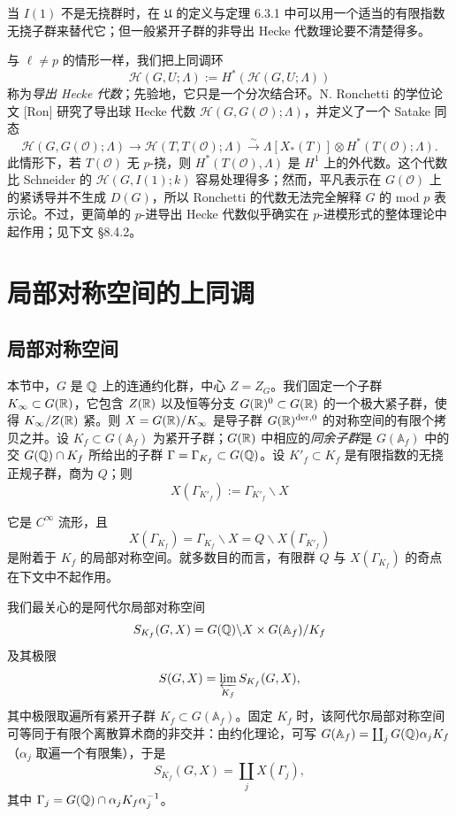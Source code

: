 当 $I(1)$ 不是无挠群时，在 $\mathfrak U$ 的定义与定理 6.3.1 中可以用一个适当的有限指数无挠子群来替代它；但一般紧开子群的非导出 Hecke 代数理论要不清楚得多。

与 $\ell\ne p$ 的情形一样，我们把上同调环
\[
\mathcal H(G,U;\Lambda):=H^*(\mathscr H(G,U;\Lambda))
\]
称为\emph{导出 Hecke 代数}；先验地，它只是一个分次结合环。N. Ronchetti 的学位论文 [Ron] 研究了导出球 Hecke 代数 $\mathcal H(G,G(\mathcal O);\Lambda)$，并定义了一个 Satake 同态
\[
\mathcal H(G,G(\mathcal O);\Lambda)\to\mathcal H(T,T(\mathcal O);\Lambda)
\xrightarrow{\sim}\Lambda[X_*(T)]\otimes H^*(T(\mathcal O);\Lambda).
\]
此情形下，若 $T(\mathcal O)$ 无 $p$-挠，则 $H^*(T(\mathcal O),\Lambda)$ 是 $H^1$ 上的外代数。这个代数比 Schneider 的 $\mathscr H(G,I(1);k)$ 容易处理得多；然而，平凡表示在 $G(\mathcal O)$ 上的紧诱导并不生成 $D(G)$，所以 Ronchetti 的代数无法完全解释 $G$ 的 mod $p$ 表示论。不过，更简单的 $p$-进导出 Hecke 代数似乎确实在 $p$-进模形式的整体理论中起作用；见下文 §8.4.2。

\section{局部对称空间的上同调}

\subsection{局部对称空间}

本节中，$G$ 是 $\mathbb{Q}$ 上的连通约化群，中心 $Z=Z_G$。我们固定一个子群 $K_\infty\subset G(\mathbb{R})$，它包含 $Z(\mathbb{R})$ 以及恒等分支 $G(\mathbb{R})^0\subset G(\mathbb{R})$ 的一个极大紧子群，使得 $K_\infty/Z(\mathbb{R})$ 紧。则 $X=G(\mathbb{R})/K_\infty$ 是导子群 $G(\mathbb{R})^{\mathrm{der},0}$ 的对称空间的有限个拷贝之并。设 $K_f\subset G(\mathbb{A}_f)$ 为紧开子群；$G(\mathbb{R})$ 中相应的\emph{同余子群}是 $G(\mathbb{A}_f)$ 中的交 $G(\mathbb{Q})\cap K_f$ 所给出的子群 $\Gamma=\Gamma_{K_f}\subset G(\mathbb{Q})$。设 $K'_f\subset K_f$ 是有限指数的无挠正规子群，商为 $Q$；则
\[
X(\Gamma_{K'_f}):=\Gamma_{K'_f}\backslash X
\]


它是 $C^\infty$ 流形，且
\[
X(\Gamma_{K_f})=\Gamma_{K_f}\backslash X=Q\backslash X(\Gamma_{K'_f})
\]
是附着于 $K_f$ 的局部对称空间。就多数目的而言，有限群 $Q$ 与 $X(\Gamma_{K_f})$ 的奇点在下文中不起作用。

我们最关心的是阿代尔局部对称空间
\[
S_{K_f}(G,X)=G(\mathbb{Q})\backslash X\times G(\mathbb{A}_f)/K_f
\]
及其极限
\[
S(G,X)=\varprojlim_{K_f}S_{K_f}(G,X),
\]
其中极限取遍所有紧开子群 $K_f\subset G(\mathbb{A}_f)$。固定 $K_f$ 时，该阿代尔局部对称空间可等同于有限个离散算术商的非交并：由约化理论，可写 $G(\mathbb{A}_f)=\coprod_j G(\mathbb{Q})\alpha_jK_f$（$\alpha_j$ 取遍一个有限集），于是
\[
S_{K_f}(G,X)=\coprod_j X(\Gamma_j),
\]
其中 $\Gamma_j=G(\mathbb{Q})\cap\alpha_jK_f\alpha_j^{-1}$。

